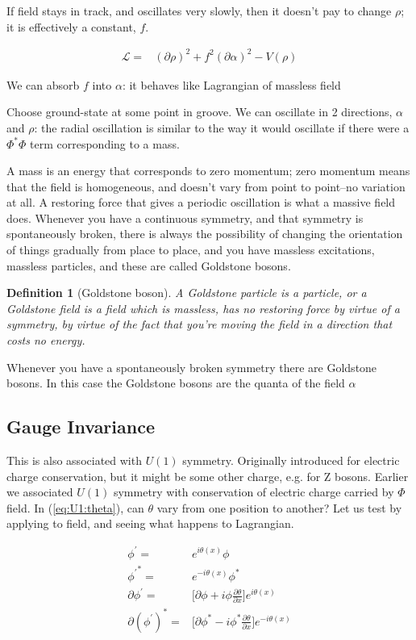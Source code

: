 \documentclass[]{article}
\newtheorem{defn}[thm]{Definition}
\begin{document}
If field stays in track, and oscillates very slowly, then it doesn't pay to change $\rho$; it is effectively a constant, $f$.

\begin{align*}
	\mathcal{L} =& (\partial \rho)^2 + f^2(\partial \alpha)^2   - V(\rho)
\end{align*}

We can absorb $f$ into $\alpha$: it behaves like Lagrangian of massless field

Choose ground-state at some point in groove. We can oscillate in 2 directions, $\alpha$ and $\rho$: the radial oscillation is similar to the way it would oscillate if there were a $\Phi^*\Phi$ term corresponding to a mass.

A mass is an energy that corresponds to zero momentum; zero momentum means that the field is homogeneous, and doesn't vary from point to point--no variation at all. A restoring force that gives a periodic oscillation is what a massive field does. Whenever you have a continuous symmetry, and that symmetry is spontaneously broken, there is always the possibility of changing the orientation of things gradually from place to place, and you have massless excitations, massless particles, and these are called Goldstone bosons.
\begin{defn}[Goldstone boson]
	 A Goldstone particle is a particle, or a Goldstone field is a field which is massless, has no restoring force by virtue of a symmetry, by virtue of the fact that you're moving the field in a direction that costs no energy.
\end{defn}
 Whenever you have a spontaneously broken symmetry there are Goldstone bosons. In this case the Goldstone bosons are the quanta of the field $\alpha$

\subsection{Gauge Invariance}\label{section:gauge:invariance}

This is also associated with $U(1)$ symmetry. Originally introduced for electric charge conservation, but it might be some other charge, e.g. for Z bosons. Earlier we associated $U(1)$ symmetry with conservation of electric charge carried by $\Phi$ field. In (\ref{eq:U1:theta}), can $\theta$ vary from one position to another? Let us test by applying to field, and seeing what happens to Lagrangian.

\begin{align*}
	\phi^\prime =& e^{i \theta(x)} \phi \\
	{\phi^\prime}^* =& e^{-i \theta(x)} \phi^*\\
	\partial \phi^\prime =& \big[\partial \phi + i \phi \frac{\partial \theta}{\partial x}\big] e^{i \theta(x)}\\
	\partial (\phi^\prime)^* =& \big[\partial \phi^* - i \phi^* \frac{\partial \theta}{\partial x}\big] e^{-i \theta(x)}
\end{align*}
\end{document}
